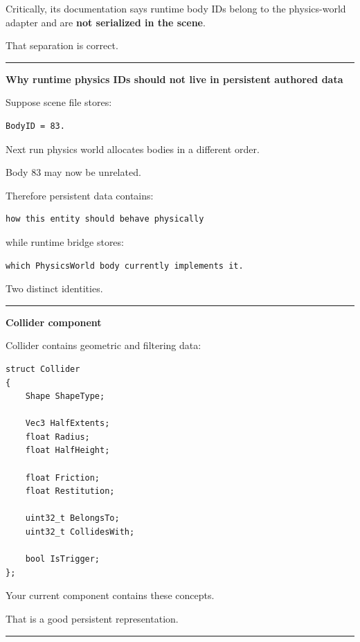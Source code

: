 Critically, its documentation says runtime body IDs belong to the physics-world adapter and are \textbf{not serialized in the scene}.

That separation is correct.

\begin{center}\rule{0.5\linewidth}{0.5pt}\end{center}

\textbf{Why runtime physics IDs should not live in persistent authored data}

Suppose scene file stores:

\begin{verbatim}
BodyID = 83.
\end{verbatim}

Next run physics world allocates bodies in a different order.

Body 83 may now be unrelated.

Therefore persistent data contains:

\begin{verbatim}
how this entity should behave physically
\end{verbatim}

while runtime bridge stores:

\begin{verbatim}
which PhysicsWorld body currently implements it.
\end{verbatim}

Two distinct identities.

\begin{center}\rule{0.5\linewidth}{0.5pt}\end{center}

\textbf{Collider component}

Collider contains geometric and filtering data:

\begin{verbatim}
struct Collider
{
    Shape ShapeType;

    Vec3 HalfExtents;
    float Radius;
    float HalfHeight;

    float Friction;
    float Restitution;

    uint32_t BelongsTo;
    uint32_t CollidesWith;

    bool IsTrigger;
};
\end{verbatim}

Your current component contains these concepts.

That is a good persistent representation.

\begin{center}\rule{0.5\linewidth}{0.5pt}\end{center}

